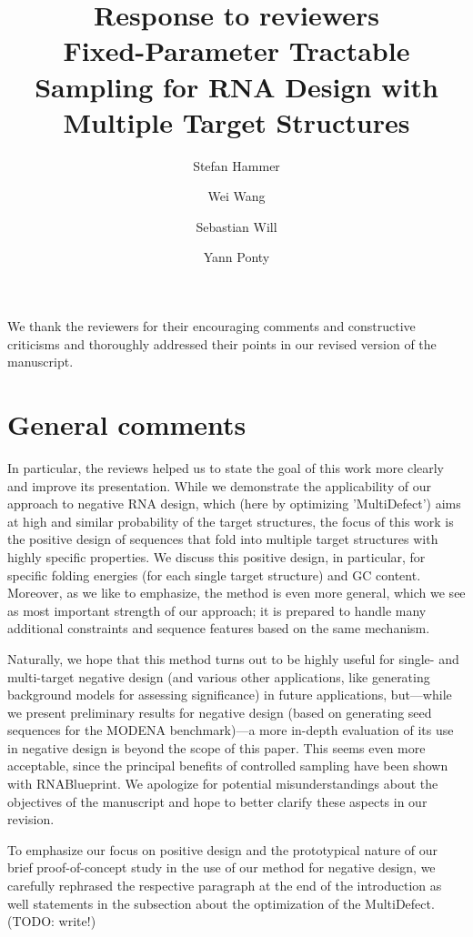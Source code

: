\documentclass[11pt,hyperref]{article} %
\title{Response to reviewers\\[.3em]Fixed-Parameter Tractable Sampling for RNA Design with Multiple Target Structures}
\author{
Stefan Hammer \and Wei Wang \and Sebastian Will \and Yann Ponty}
\date{} %
\begin{document}
\maketitle

We thank the reviewers for their encouraging comments and constructive criticisms and thoroughly addressed their points in our revised version of the manuscript.

\section{General comments}

In particular, the reviews helped us to state the goal of this work more clearly and improve its presentation. While we demonstrate the applicability of our approach to negative RNA design, which (here by optimizing 'MultiDefect') aims at high and similar probability of the target structures, the focus of this work is the positive design of sequences that fold into multiple target structures with highly specific properties. We discuss this positive design, in particular, for specific folding energies (for each single target structure) and GC content. Moreover, as we like to emphasize, the method is even more general, which we see as most important strength of our approach; it is prepared to handle many additional constraints and sequence features based on the same mechanism. 

Naturally, we hope that this method turns out to be highly useful for single- and multi-target negative design (and various other applications, like generating background models for assessing significance) in future applications, but---while we present preliminary results for negative design (based on generating seed sequences for the MODENA benchmark)---a more in-depth evaluation of its use in negative design is beyond the scope of this paper. This seems even more acceptable, since the principal benefits of controlled sampling have been shown with RNABlueprint. We apologize for potential misunderstandings about the objectives of the manuscript and hope to better clarify these aspects in our revision.

To emphasize our focus on positive design and the prototypical nature of our brief proof-of-concept study in the use of our method for negative design, we carefully rephrased the respective paragraph at the end of the introduction as well statements in the subsection about the optimization of the MultiDefect. (TODO: write!)

\end{document}

